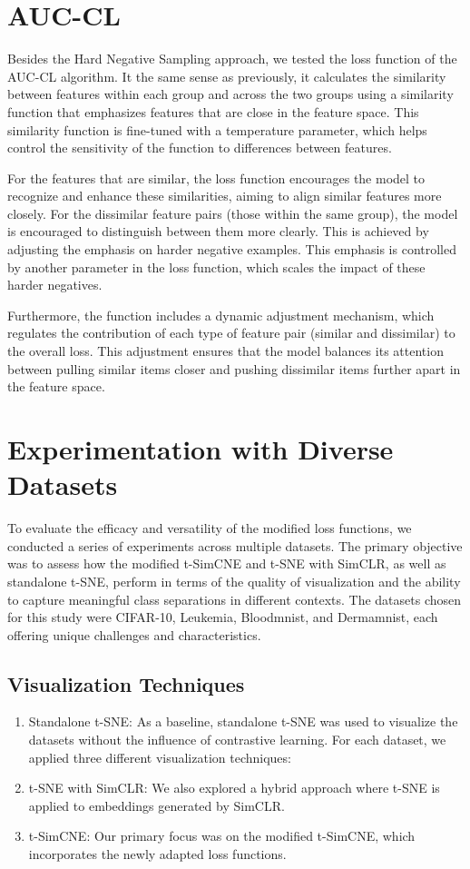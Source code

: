 \section{AUC-CL}

Besides the Hard Negative Sampling approach, we tested the loss function of the AUC-CL algorithm. It the same sense as previously, it calculates the similarity between features within each group and across the two groups using a similarity function that emphasizes features that are close in the feature space. This similarity function is fine-tuned with a temperature parameter, which helps control the sensitivity of the function to differences between features.

For the features that are similar, the loss function encourages the model to recognize and enhance these similarities, aiming to align similar features more closely. For the dissimilar feature pairs (those within the same group), the model is encouraged to distinguish between them more clearly. This is achieved by adjusting the emphasis on harder negative examples. This emphasis is controlled by another parameter in the loss function, which scales the impact of these harder negatives.

Furthermore, the function includes a dynamic adjustment mechanism, which regulates the contribution of each type of feature pair (similar and dissimilar) to the overall loss. This adjustment ensures that the model balances its attention between pulling similar items closer and pushing dissimilar items further apart in the feature space.

\section{Experimentation with Diverse Datasets}

To evaluate the efficacy and versatility of the modified loss functions, we conducted a series of experiments across multiple datasets. The primary objective was to assess how the modified t-SimCNE and t-SNE with SimCLR, as well as standalone t-SNE, perform in terms of the quality of visualization and the ability to capture meaningful class separations in different contexts. The datasets chosen for this study were CIFAR-10, Leukemia, Bloodmnist, and Dermamnist, each offering unique challenges and characteristics.

\subsection{Visualization Techniques}
\begin{enumerate}
\item {Standalone t-SNE}: As a baseline, standalone t-SNE was used to visualize the datasets without the influence of contrastive learning.
For each dataset, we applied three different visualization techniques:
\item {t-SNE with SimCLR}: We also explored a hybrid approach where t-SNE is applied to embeddings generated by SimCLR.
\item {t-SimCNE}: Our primary focus was on the modified t-SimCNE, which incorporates the newly adapted loss functions.
\end{enumerate}

